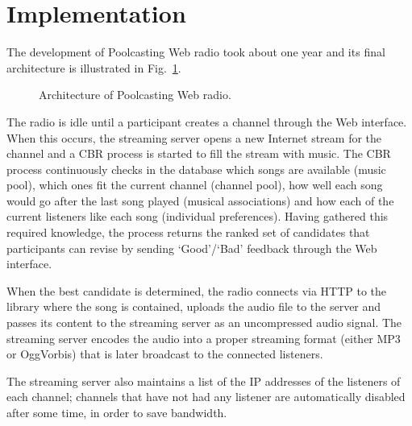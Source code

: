 

\section{Implementation}\label{subsection:architecture}

%
The development of Poolcasting Web radio took about one year and %
its final architecture is illustrated in Fig.~\ref{fig:poolcasting-architecture}.
%
\begin{figure}[bthp]
\centering \setlength{\abovecaptionskip}{3pt}
\caption{Architecture of Poolcasting Web radio.}
\label{fig:poolcasting-architecture}
\end{figure}

The radio is idle until a participant creates a channel through the Web interface.
When this occurs, the streaming server opens a new Internet stream for the channel and a CBR process is started to fill the stream with music.
The CBR process continuously checks in the database which songs are available (music pool), which ones fit the current channel (channel pool), how well each song would go after the last song played (musical associations) and how each of the current listeners like each song (individual preferences).
Having gathered this required knowledge, the process returns the ranked set of candidates that participants can revise by sending `Good'/`Bad' feedback through the Web interface.

When the best candidate is determined, the radio connects via HTTP to the library where the song is contained, uploads the audio file to the server and passes its content to the streaming server as an uncompressed audio signal.
The streaming server encodes the audio into a proper streaming format (either 
MP3 or OggVorbis) that is later broadcast to the connected listeners.

The streaming server also maintains a list of the IP addresses of the listeners of each channel; channels that have not had any listener are automatically disabled after some time, in order to save bandwidth.


